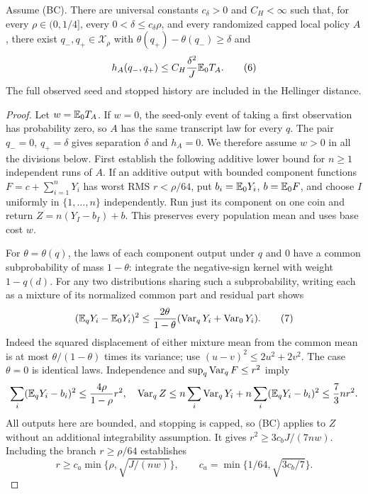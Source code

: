 \begin{lemma}\label{lem:hard-pair}
Assume (BC). There are universal constants $c_\delta>0$ and $C_H<\infty$
such that, for every $\rho\in(0,1/4]$, every
$0<\delta\le c_\delta\rho$, and every randomized capped local policy $A$,
there exist $q_-,q_+\in\mathcal X_\rho$ with
$\theta(q_+)-\theta(q_-)\ge\delta$ and
\[
 h_A(q_-,q_+)\le C_H\frac{\delta^2}{J}\mathbb E_0T_A.              \tag{6}
\]
The full observed seed and stopped history are included in the Hellinger
distance.
\end{lemma}
\begin{proof}
Let $w=\mathbb E_0T_A$. If $w=0$, the seed-only event of taking a first observation
has probability zero, so $A$ has the same transcript law for every $q$.
The pair $q_-=0$, $q_+=\delta$ gives separation $\delta$ and $h_A=0$.
We therefore assume $w>0$ in all the divisions below.
First establish the following additive lower bound for
$n\ge1$ independent runs of $A$. If an additive output with bounded
component functions
$F=c+\sum_{i=1}^nY_i$ has worst RMS $r<\rho/64$, put
$b_i=\mathbb E_0Y_i$, $b=\mathbb E_0F$, and choose $I$ uniformly in $\{1,\ldots,n\}$
independently. Run just its component on one coin and return
$Z=n(Y_I-b_I)+b$. This preserves every population mean and uses base cost
$w$.

For $\theta=\theta(q)$, the laws of each component output under $q$ and
$0$ have a common subprobability of mass $1-\theta$: integrate the
negative-sign kernel with weight $1-q(d)$. For any two distributions
sharing such a subprobability, writing each as a mixture of its normalized
common part and residual part shows
\[
 (\mathbb E_qY_i-\mathbb E_0Y_i)^2
 \le\frac{2\theta}{1-\theta}
       (\operatorname{Var}_qY_i+\operatorname{Var}_0Y_i).                              \tag{7}
\]
Indeed the squared displacement of either mixture mean from the common
mean is at most $\theta/(1-\theta)$ times its variance; use
$(u-v)^2\le2u^2+2v^2$. The case $\theta=0$ is identical laws.
Independence and $\sup_q\operatorname{Var}_qF\le r^2$ imply
\[
 \sum_i(\mathbb E_qY_i-b_i)^2\le\frac{4\rho}{1-\rho}r^2,
 \quad
 \operatorname{Var}_qZ\le n\sum_i\operatorname{Var}_qY_i
                 +n\sum_i(\mathbb E_qY_i-b_i)^2
              \le\frac73nr^2.
\]
All outputs here are bounded, and stopping is capped, so (BC) applies to
$Z$ without an additional integrability assumption. It gives
$r^2\ge3c_bJ/(7nw)$. Including the branch $r\ge\rho/64$ establishes
\[
 r\ge c_a\min\{\rho,\sqrt{J/(nw)}\},\qquad
 c_a=\min\{1/64,\sqrt{3c_b/7}\}.                           \tag{8}
\]


\end{proof}
